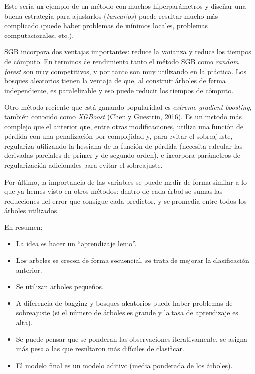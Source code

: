 \documentclass[
  spanish,
]{book}
\theoremstyle{break}
\theoremstyle{definition}
\theoremstyle{definition}
\theoremstyle{definition}
\theoremstyle{remark}
\begin{document}
Este sería un ejemplo de un método con muchos hiperparámetros y diseñar una buena estrategia para ajustarlos (\emph{tunearlos}) puede resultar mucho más complicado (puede haber problemas de mínimos locales, problemas computacionales, etc.).

SGB incorpora dos ventajas importantes: reduce la varianza y reduce los tiempos de cómputo.
En terminos de rendimiento tanto el método SGB como \emph{random forest} son muy competitivos, y por tanto son muy utilizando en la práctica.
Los bosques aleatorios tienen la ventaja de que, al construir árboles de forma independiente, es paralelizable y eso puede reducir los tiempos de cómputo.

Otro método reciente que está ganando popularidad es \emph{extreme gradient boosting}, también conocido como \emph{XGBoost} (Chen y Guestrin, \protect\hyperlink{ref-chen2016xgboost}{2016}).
Es un metodo más complejo que el anterior que, entre otras modificaciones, utiliza una función de pérdida con una penalización por complejidad y, para evitar el sobreajuste, regulariza utilizando la hessiana de la función de pérdida (necesita calcular las derivadas parciales de primer y de segundo orden), e incorpora parámetros de regularización adicionales para evitar el sobreajuste.

Por último, la importancia de las variables se puede medir de forma similar a lo que ya hemos visto en otros métodos: dentro de cada árbol se sumas las reducciones del error que consigue cada predictor, y se promedia entre todos los árboles utilizados.

En resumen:

\begin{itemize}
\item
  La idea es hacer un ``aprendizaje lento''.
\item
  Los arboles se crecen de forma secuencial, se trata de mejorar la
  clasificación anterior.
\item
  Se utilizan arboles pequeños.
\item
  A diferencia de bagging y bosques aleatorios puede haber problemas de sobreajuste (si el número de árboles es grande y la tasa de aprendizaje es alta).
\item
  Se puede pensar que se ponderan las observaciones iterativamente, se
  asigna más peso a las que resultaron más difíciles de clasificar.
\item
  El modelo final es un modelo aditivo (media ponderada de los
  árboles).
\end{itemize}
\end{document}
